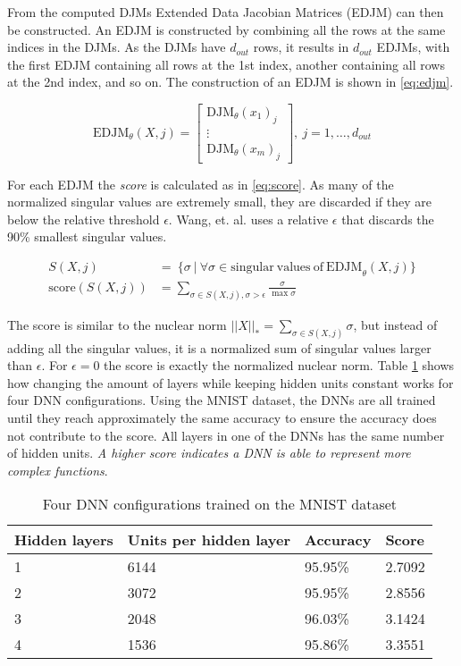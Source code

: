 From the computed DJMs Extended Data Jacobian Matrices (EDJM) can then be constructed. An EDJM is constructed by combining all the rows at the same indices in the DJMs. As the DJMs have $d_{out}$ rows, it results in $d_{out}$ EDJMs, with the first EDJM containing all rows at the 1st index, another containing all rows at the 2nd index, and so on. The construction of an EDJM is shown in \eqref{eq:edjm}.

\begin{equation} \label{eq:edjm}
\mathrm{EDJM}_{\theta}(X, j) =
\begin{bmatrix}
\mathrm{DJM}_{\theta}(x_1)_j \\
\vdots \\
\mathrm{DJM}_{\theta}(x_m)_j
\end{bmatrix},\ j=1,\dots,d_{out}
\end{equation}

For each EDJM the \textit{score} is calculated as in \eqref{eq:score}. As many of the normalized singular values are extremely small, they are discarded if they are below the relative threshold $\epsilon$. Wang, et. al. uses a relative $\epsilon$ that discards the 90\% smallest singular values.

\begin{equation} \label{eq:score}
  \begin{split}
  S(X, j) &=\ \{\sigma\ |\ \forall \sigma \in \mathrm{singular\ values\ of\ EDJM}_{\theta}(X, j) \} \\  
  \mathrm{score}(S(X, j)) &=  \sum_{\sigma \in S(X, j), \sigma > \epsilon} \frac{\sigma}{\max{\sigma}}  
  \end{split}
\end{equation}

The score is similar to the nuclear norm $||X||_* = \sum_{\sigma \in S(X, j)} \sigma$, but instead of adding all the singular values, it is a normalized sum of singular values larger than $\epsilon$. For $\epsilon=0$ the score is exactly the normalized nuclear norm. Table \ref{tab:dnn:score} shows how changing the amount of layers while keeping hidden units constant works for four DNN configurations. Using the MNIST dataset, the DNNs are all trained until they reach approximately the same accuracy to ensure the accuracy does not contribute to the score. All layers in one of the DNNs has the same number of hidden units. \textit{A higher score indicates a DNN is able to represent more complex functions}.

\begin{table}[H]
  \centering
    \begin{tabular}{|l|l|l|l|} \hline
      Hidden layers & Units per hidden layer & Accuracy & Score \\ \hline
      1 & 6144 & 95.95\% & 2.7092 \\ \hline
      2 & 3072 & 95.95\% & 2.8556 \\ \hline
      3 & 2048 & 96.03\% & 3.1424 \\ \hline
      4 & 1536 & 95.86\% & 3.3551 \\ \hline
    \end{tabular}
    \caption{Four DNN configurations trained on the MNIST dataset}
    \label{tab:dnn:score}
  \end{table}

